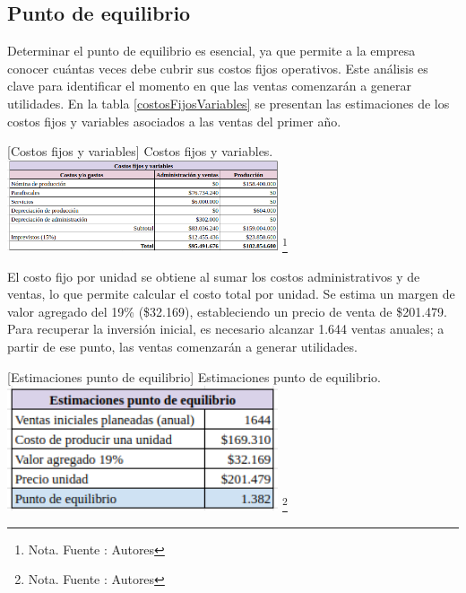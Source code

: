 \subsection{Punto de equilibrio}

Determinar el punto de equilibrio es esencial, ya que permite a la empresa conocer cuántas veces debe cubrir sus costos fijos operativos. Este análisis es clave para identificar el momento en que las ventas comenzarán a generar utilidades. En la tabla \ref{costosFijosVariables} se presentan las estimaciones de los costos fijos y variables asociados a las ventas del primer año.

\vspace{2mm}
\begin{minipage}{0.9\textwidth}
\centering
{}[{Costos fijos y variables}]{ Costos fijos y variables. }
\label{costosFijosVariables}
\includegraphics[width=0.6\textwidth]{Content/Images/AF/PuntoDeEquilibrio_CostosFijosYVar.png}
\footnote{Nota. \textup{Fuente : Autores}}
\end{minipage}

El costo fijo por unidad se obtiene al sumar los costos administrativos y de ventas, lo que permite calcular el costo total por unidad. Se estima un margen de valor agregado del 19\% (\$32.169), estableciendo un precio de venta de \$201.479. Para recuperar la inversión inicial, es necesario alcanzar 1.644 ventas anuales; a partir de ese punto, las ventas comenzarán a generar utilidades.

\vspace{2mm}
\begin{minipage}{0.9\textwidth}
\centering
{}[{Estimaciones punto de equilibrio}]{ Estimaciones punto de equilibrio. }
\label{calculosPuntoEquilirbio}
\includegraphics[width=0.6\textwidth]{Content/Images/AF/PuntoDeEquilibrio_Estimacion.png}
\footnote{Nota. \textup{Fuente : Autores}}
\end{minipage}

